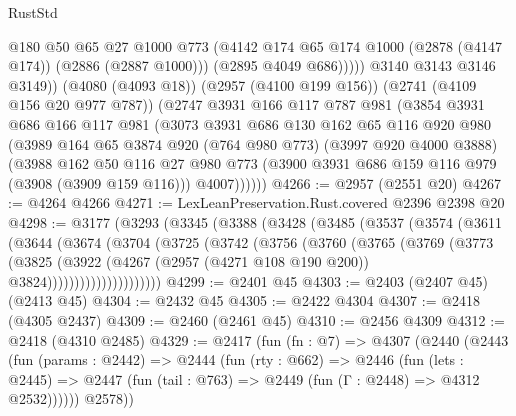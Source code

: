 \begin{lexlean}{RustStd}
\begin{coremodule}
                  @180
                  @50
                  @65
                  @27
                  @1000
                  @773
                  (@4142 @174 @65 @174 @1000 (@2878 (@4147 @174)) (@2886 (@2887 @1000)))
                  (@2895 @4049 @686)))))
          @3140
          @3143
          @3146
          @3149))
      (@4080 (@4093 @18))
      (@2957 (@4100 @199 @156))
      (@2741 (@4109 @156 @20 @977 @787))
      (@2747
        @3931
        @166
        @117
        @787
        @981
        (@3854
          @3931
          @686
          @166
          @117
          @981
          (@3073
            @3931
            @686
            @130
            @162
            @65
            @116
            @920
            @980
            (@3989
              @164
              @65
              @3874
              @920
              (@764 @980 @773)
              (@3997 @920 @4000 @3888)
              (@3988
                @162
                @50
                @116
                @27
                @980
                @773
                (@3900 @3931 @686 @159 @116 @979 (@3908 (@3909 @159 @116)))
                @4007))))))
@4266 := @2957 (@2551 @20)
@4267 := @4264 @4266
@4271 := LexLeanPreservation.Rust.covered @2396 @2398 @20
@4298 := @3177
    (@3293
      (@3345
        (@3388
          (@3428
            (@3485
              (@3537
                (@3574
                  (@3611
                    (@3644
                      (@3674
                        (@3704
                          (@3725
                            (@3742
                              (@3756
                                (@3760
                                  (@3765
                                    (@3769
                                      (@3773
                                        (@3825
                                          (@3922
                                            (@4267
                                              (@2957 (@4271 @108 @190 @200))
                                              @3824)))))))))))))))))))))
@4299 := @2401 @45
@4303 := @2403 (@2407 @45) (@2413 @45)
@4304 := @2432 @45
@4305 := @2422 @4304
@4307 := @2418 (@4305 @2437)
@4309 := @2460 (@2461 @45)
@4310 := @2456 @4309
@4312 := @2418 (@4310 @2485)
@4329 := @2417
    (fun (fn : @7) =>
    @4307
      (@2440
        (@2443
          (fun (params : @2442) =>
          @2444
            (fun (rty : @662) =>
            @2446
              (fun (lets : @2445) =>
              @2447 (fun (tail : @763) => @2449 (fun (Γ : @2448) => @4312 @2532))))))
        @2578))

\end{coremodule}
\end{lexlean}
